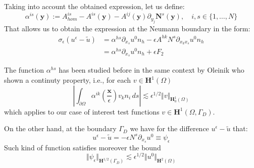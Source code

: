 Taking into account the obtained expression, let us define:
\begin{equation*}
    \alpha^{is}(\mathbf{y}) := A^{is}_{hom} - A^{is}(\mathbf{y}) - A^{ij}(\mathbf{y}) \partial_{y_j} \mathbf{N}^s(\mathbf{y}), \quad i,s \in \{1,\dots, N\}
\end{equation*}
That allows us to obtain the expression at the Neumann boundary in the form:
\begin{equation}
    \label{NeumannExp}
    \begin{aligned}
    \sigma_{\epsilon} (u^{\epsilon}-\tilde{u}) &= \alpha^{hs} \partial_{x_s} u^0 n_h - \epsilon A^{hk}N^s \partial_{x_k x_s} u^0 n_h \\
    & = \alpha^{hs} \partial_{x_s} u^0 n_h + \epsilon F_2
    \end{aligned}
\end{equation}

The function $\alpha^{hs}$ has been studied before in the same context by Oleinik \cite{oleinik1992mathematical} who shown a continuty property, i.e., for each $v \in \mathbf{H}^1(\Omega)$ 
\begin{equation}
    \label{OleinikLemma2.2}
    \left \vert \int_{\partial \Omega} \alpha^{ik}(\frac{\mathbf{x}}{\epsilon}) v_k n_i \,ds \right \vert \lesssim\epsilon^{1/2} \Vert v \Vert_{\mathbf{H}_0^1(\Omega)}
\end{equation}
which applies to our case of interest test functions $v \in \mathbf{H}^1(\Omega, \Gamma_D)$.

On the other hand, at the boundary $\Gamma_D$ we have for the difference $u^{\epsilon} - \tilde{u}$ that:
\begin{equation*}
    u^{\epsilon} - \tilde{u} = - \epsilon N^s \partial_{x_s}u^0 \equiv \psi_{\epsilon}
\end{equation*} 
Such kind of function satisfies moreover the bound
\begin{equation}
    \label{BoundDirichlet}
    \Vert \psi_{\epsilon} \Vert_{\mathbf{H}^{1/2}(\Gamma_D)} \lesssim \epsilon^{1/2} \Vert u^0 \Vert_{\mathbf{H}^2(\Omega)}
\end{equation} 


